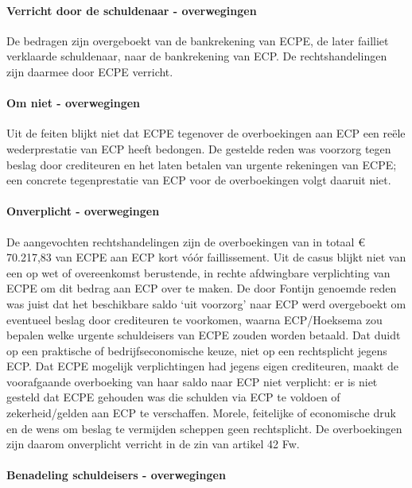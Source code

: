 \documentclass[
  dutch,
  a4paper,
]{article}
\begin{document}
\paragraph{Verricht door de schuldenaar - overwegingen}\label{verricht-door-de-schuldenaar---overwegingen-52}

De bedragen zijn overgeboekt van de bankrekening van ECPE, de later failliet verklaarde schuldenaar, naar de bankrekening van ECP. De rechtshandelingen zijn daarmee door ECPE verricht.

\paragraph{Om niet - overwegingen}\label{om-niet---overwegingen-52}

Uit de feiten blijkt niet dat ECPE tegenover de overboekingen aan ECP een reële wederprestatie van ECP heeft bedongen. De gestelde reden was voorzorg tegen beslag door crediteuren en het laten betalen van urgente rekeningen van ECPE; een concrete tegenprestatie van ECP voor de overboekingen volgt daaruit niet.

\paragraph{Onverplicht - overwegingen}\label{onverplicht---overwegingen-52}

De aangevochten rechtshandelingen zijn de overboekingen van in totaal € 70.217,83 van ECPE aan ECP kort vóór faillissement. Uit de casus blijkt niet van een op wet of overeenkomst berustende, in rechte afdwingbare verplichting van ECPE om dit bedrag aan ECP over te maken. De door Fontijn genoemde reden was juist dat het beschikbare saldo `uit voorzorg' naar ECP werd overgeboekt om eventueel beslag door crediteuren te voorkomen, waarna ECP/Hoeksema zou bepalen welke urgente schuldeisers van ECPE zouden worden betaald. Dat duidt op een praktische of bedrijfseconomische keuze, niet op een rechtsplicht jegens ECP. Dat ECPE mogelijk verplichtingen had jegens eigen crediteuren, maakt de voorafgaande overboeking van haar saldo naar ECP niet verplicht: er is niet gesteld dat ECPE gehouden was die schulden via ECP te voldoen of zekerheid/gelden aan ECP te verschaffen. Morele, feitelijke of economische druk en de wens om beslag te vermijden scheppen geen rechtsplicht. De overboekingen zijn daarom onverplicht verricht in de zin van artikel 42 Fw.

\paragraph{Benadeling schuldeisers - overwegingen}\label{benadeling-schuldeisers---overwegingen-52}
\end{document}
